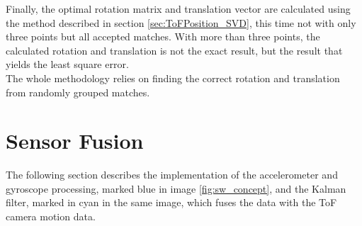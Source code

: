 Finally, the optimal rotation matrix and translation vector are calculated using the method described in section \ref{sec:ToFPosition_SVD}, this time not with only three points but all accepted matches. With more than three points, the calculated rotation and translation is not the exact result, but the result that yields the least square error.\cite{SVD_ETH}\\
The whole methodology relies on finding the correct rotation and translation from randomly grouped matches. 

\section{Sensor Fusion}
\label{sec:PositionEstimate}
The following section describes the implementation of the accelerometer and gyroscope processing, marked blue in image \ref{fig:sw_concept}, and the Kalman filter, marked in cyan in the same image, which fuses the data with the ToF camera motion data.

